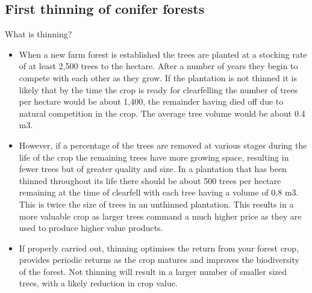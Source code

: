 \subsection*{First thinning of conifer forests}

What is thinning?

\begin{itemize}
\item When a new farm forest is established the trees are planted at a stocking rate of at least 2,500 trees to the hectare. After a number of years they begin to compete with each other as they grow. If the plantation is not thinned it is likely that by the time the crop is ready for clearfelling the number of trees per hectare would be about 1,400, the remainder having died off due to natural competition in the crop. The average tree volume would be about 0.4 m3.
\item 
However, if a percentage of the trees are removed at various stages during the life of the crop the remaining trees have more growing space, resulting in fewer trees but of greater quality and size. In a plantation that has been thinned throughout its life there should be about 500 trees per hectare remaining at the time of clearfell with each tree having a volume of 0.8 m3. This is twice the size of trees in an unthinned plantation. This results in a more valuable crop as larger trees command a much higher price as they are used to produce higher value products.
\item 
If properly carried out, thinning optimises the return from your forest crop, provides periodic returns as the crop matures and improves the biodiversity of the forest. Not thinning will result in a larger number of smaller sized trees, with a likely reduction in crop value.
\end{itemize}



